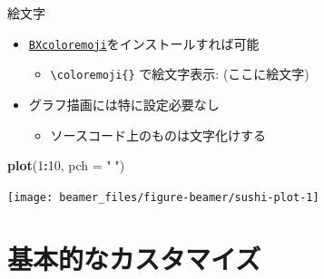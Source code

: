 \documentclass[
  12pt,
  ignorenonframetext,
]{beamer}
\newenvironment{Shaded}{\begin{snugshade}}{\end{snugshade}}
\newcommand{\DataTypeTok}[1]{\textcolor[rgb]{0.13,0.29,0.53}{#1}}
\newcommand{\DecValTok}[1]{\textcolor[rgb]{0.00,0.00,0.81}{#1}}
\newcommand{\KeywordTok}[1]{\textcolor[rgb]{0.13,0.29,0.53}{\textbf{#1}}}
\newcommand{\NormalTok}[1]{#1}
\newcommand{\OperatorTok}[1]{\textcolor[rgb]{0.81,0.36,0.00}{\textbf{#1}}}
\newcommand{\StringTok}[1]{\textcolor[rgb]{0.31,0.60,0.02}{#1}}
\providecommand{\tightlist}{%
  \setlength{\itemsep}{0pt}\setlength{\parskip}{0pt}}
\begin{document}
\begin{frame}[fragile]{絵文字}
\protect\hypertarget{ux7d75ux6587ux5b57}{}

\begin{itemize}
\tightlist
\item
  \href{https://github.com/zr-tex8r/BXcoloremoji}{\texttt{BXcoloremoji}}をインストールすれば可能

  \begin{itemize}
  \tightlist
  \item
    \texttt{\textbackslash{}coloremoji\{\}} で絵文字表示:
    \ifdefined{} {} \else (ここに絵文字) \fi
  \end{itemize}
\item
  グラフ描画には特に設定必要なし

  \begin{itemize}
  \tightlist
  \item
    ソースコード上のものは文字化けする
  \end{itemize}
\end{itemize}

\begin{Shaded}
\begin{Highlighting}[]
\KeywordTok{plot}\NormalTok{(}\DecValTok{1}\OperatorTok{:}\DecValTok{10}\NormalTok{, }\DataTypeTok{pch =} \StringTok{"🍣"}\NormalTok{)}
\end{Highlighting}
\end{Shaded}

\begin{center}\texttt{[image: beamer\_files/figure-beamer/sushi-plot-1]} \end{center}

\end{frame}

\hypertarget{ux57faux672cux7684ux306aux30abux30b9ux30bfux30deux30a4ux30ba}{%
\section{基本的なカスタマイズ}\label{ux57faux672cux7684ux306aux30abux30b9ux30bfux30deux30a4ux30ba}}
\end{document}
